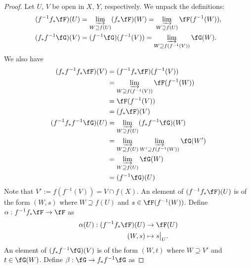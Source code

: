 \documentclass[a4paper]{article}
\begin{document}
\begin{enumerate} [label=\textbf{\arabic*.}, leftmargin=0em]
          \begin{proof}
              Let $U$, $V$ be open in $X$, $Y$, respectively. We unpack the definitions:
              \begin{align*}
                  (f^{-1} f_* \fF)(U) & = \varinjlim_{W \supseteq f(U)} (f_* \fF)(W) = \varinjlim_{W \supseteq f(U)} \fF(f^{-1}(W)), \\
                  (f_* f^{-1} \fG)(V) & = (f^{-1} \fG)(f^{-1}(V)) = \varinjlim_{W \supseteq f(f^{-1}(V))} \fG(W).
              \end{align*}
              We also have
              \begin{align*}
                  (f_*f^{-1}f_* \fF)(V)      & = (f^{-1} f_* \fF)(f^{-1}(V))                                                  \\
                                             & = \varinjlim_{W \supseteq f(f^{-1}(V))} \fF(f^{-1}(W))                         \\
                                             & = \fF(f^{-1}(V))                                                               \\
                                             & = (f_* \fF)(V)                                                                 \\
                  (f^{-1} f_* f^{-1} \fG)(U) & = \varinjlim_{W \supseteq f(U)} (f_* f^{-1} \fG)(W)                            \\
                                             & = \varinjlim_{W \supseteq f(U)} \varinjlim_{W' \supseteq f(f^{-1}(W))} \fG(W') \\
                                             & = \varinjlim_{W \supseteq f(U)} \fG(W)                                         \\
                                             & = (f^{-1} \fG)(U)
              \end{align*}
              Note that $V' := f(f^{-1}(V)) = V \cap f(X)$. An element of $(f^{-1} f_* \fF)(U)$ is of the form $(W, s)$ where $W \supseteq f(U)$ and $s \in \fF(f^{-1}(W))$. Define $\alpha : f^{-1} f_* \fF \to \fF$ as
              \begin{align*}
                  \alpha(U) : (f^{-1}f_* \fF)(U) & \to \fF(U)            \\
                  (W, s)                         & \mapsto \restr{s}{U}.
              \end{align*}
              An element of $(f_* f^{-1} \fG)(V)$ is of the form $(W, t)$ where $W \supseteq V'$ and $t \in \fG(W)$. Define $\beta : \fG \to f_* f^{-1} \fG$ as

\end{proof}
\end{enumerate}
\end{document}
